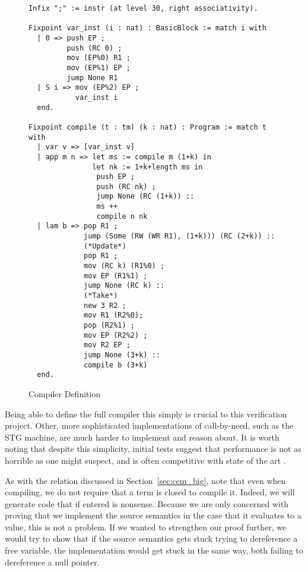 \begin{figure}
\begin{lstlisting}
Infix ";" := instr (at level 30, right associativity).

Fixpoint var_inst (i : nat) : BasicBlock := match i with
  | 0 => push EP ;
         push (RC 0) ;
         mov (EP%0) R1 ;
         mov (EP%1) EP ;
         jump None R1
  | S i => mov (EP%2) EP ;
           var_inst i
  end.

Fixpoint compile (t : tm) (k : nat) : Program := match t with
  | var v => [var_inst v]
  | app m n => let ms := compile m (1+k) in
               let nk := 1+k+length ms in
                push EP ;
                push (RC nk) ;
                jump None (RC (1+k)) ::
                ms ++
                compile n nk
  | lam b => pop R1 ;
             jump (Some (RW (WR R1), (1+k))) (RC (2+k)) ::
             (*Update*)
             pop R1 ;
             mov (RC k) (R1%0) ;
             mov EP (R1%1) ;
             jump None (RC k) ::
             (*Take*)
             new 3 R2 ;
             mov R1 (R2%0);
             pop (R2%1) ;
             mov EP (R2%2) ;
             mov R2 EP ;
             jump None (3+k) ::
             compile b (3+k)
  end. 
\end{lstlisting}
\caption{Compiler Definition}
\label{fig:compiler}
\end{figure}

Being able to define the full compiler this simply is crucial to this
verification project. Other, more sophisticated implementations of call-by-need,
such as the STG machine, are much harder to implement and reason about. It is
worth noting that despite this simplicity, initial tests suggest that performance
is not as horrible as one might suspect, and is often competitive with state of
the art \cite{cem}.

As with the relation discussed in Section~\ref{sec:cem_big}, note that even when
compiling, we do not require that a term is closed to compile it. Indeed, we
will generate code that if entered is nonsense. Because we are only concerned
with proving that we implement the source semantics in the case that it
evaluates to a value, this is not a problem. If we wanted to strengthen our
proof further, we would try to show that if the source semantics gets stuck trying to
dereference a free variable, the implementation would get stuck in the same way,
both failing to dereference a null pointer.    
